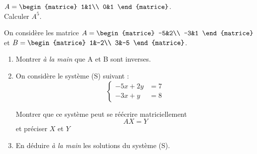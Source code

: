 \begin{exercice}[ ]
	
	$A=\begin{matrice}
			1&1\\
			0&1
		\end{matrice}$.\\
	
	Calculer $A^5$.
\end{exercice}

\begin{exercice}
	
	On considère les matrice $A=\begin{matrice}
			-5&2\\
			-3&1
		\end{matrice}$ et $B=\begin{matrice}
			1&-2\\
			3&-5
		\end{matrice}$.
	
	\begin{enumerate}
		\item 	Montrer \textit{à la main} que A et B sont inverses.
		\item 	On considère le système (S) suivant :
		      $$\begin{cases}
				      -5x+2y & =7 \\
				      -3x+y  & =8
			      \end{cases}$$
		      
		      Montrer que ce système peut se réécrire matriciellement $$AX=Y$$ et préciser $X$ et $Y$
		\item 	En déduire \textit{à la main} les solutions du système (S).\\
	\end{enumerate}
\end{exercice}

